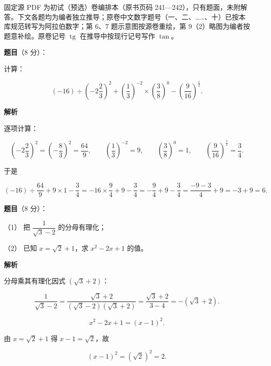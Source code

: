 

\begin{gktip}
固定源 PDF 为初试（预选）卷编排本（原书页码 241—242），只有题面，未附解答。下文各题均为编者独立推导；原卷中文数字题号（一、二、……、十）已按本库规范转写为阿拉伯数字；第 6、7 题示意图按源卷重绘，第 9（2）略图为编者按题意补绘。原卷记号 $\operatorname{tg}$ 在推导中按现行记号写作 $\tan$。
\end{gktip}

\begin{answer}

\textbf{题目}（8 分）：

计算：

\nopagebreak[4]
\[
(-16)\div\left(-2\frac{2}{3}\right)^2+\left(\frac{1}{3}\right)^{-2}\times\left(\frac{3}{8}\right)^0-\left(\frac{9}{16}\right)^{\frac{1}{2}}.
\]

\textbf{解析}

逐项计算：

\nopagebreak[4]
\[
\left(-2\frac{2}{3}\right)^2=\left(-\frac{8}{3}\right)^2=\frac{64}{9},\qquad
\left(\frac{1}{3}\right)^{-2}=9,\qquad
\left(\frac{3}{8}\right)^0=1,\qquad
\left(\frac{9}{16}\right)^{\frac{1}{2}}=\frac{3}{4}.
\]

于是

\nopagebreak[4]
\[
(-16)\div\frac{64}{9}+9\times1-\frac{3}{4}
=-16\times\frac{9}{4}+9-\frac{3}{4}
=-\frac{9}{4}+9-\frac{3}{4}
=\frac{-9-3}{4}+9
=-3+9=6.
\]


\end{answer}
\begin{answer}

\textbf{题目}（8 分）：

（1） 把 $\dfrac{1}{\sqrt{3}-2}$ 的分母有理化；

（2） 已知 $x=\sqrt{2}+1$，求 $x^2-2x+1$ 的值。

\textbf{解析}


分母乘其有理化因式 $(\sqrt{3}+2)$：

\nopagebreak[4]
\[
\frac{1}{\sqrt{3}-2}
=\frac{\sqrt{3}+2}{(\sqrt{3}-2)(\sqrt{3}+2)}
=\frac{\sqrt{3}+2}{3-4}
=-(\sqrt{3}+2).
\]


\nopagebreak[4]
\[
x^2-2x+1=(x-1)^2.
\]

由 $x=\sqrt{2}+1$ 得 $x-1=\sqrt{2}$，故

\nopagebreak[4]
\[
(x-1)^2=(\sqrt{2})^2=2.
\]



\end{answer}
